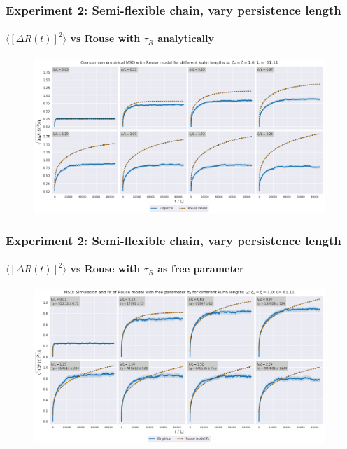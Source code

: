 \documentclass[handout]{beamer}
\newcommand{\mean}[1]{\langle #1 \rangle}
\begin{document}
\begin{frame}
    \frametitle{Experiment 2: Semi-flexible chain, vary persistence length}
    \framesubtitle{$\mean{[\Delta R(t)]^2}$ vs Rouse with $\tau_R$ analytically}

    \begin{figure}[h]
        \includegraphics[width=11cm]{./4-exp-delta_R-rouse_anal.png}
    \end{figure}
\end{frame}


\begin{frame}
    \frametitle{Experiment 2: Semi-flexible chain, vary persistence length}
    \framesubtitle{$\mean{[\Delta R(t)]^2}$ vs Rouse with $\tau_R$ as free parameter}

    \begin{figure}[h]
        \includegraphics[width=11cm]{./4-exp-delta_R-rouse_fit.png}
    \end{figure}
\end{frame}
\end{document}
